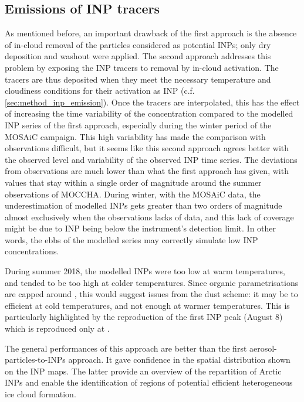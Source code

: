     \subsection{Emissions of INP tracers} 
    \label{sec:emissions_of_inp_tracers}
    As mentioned before, an important drawback of the first approach is the absence of in-cloud removal of the particles considered as potential INPs; only dry deposition and washout were applied.
    The second approach addresses this problem by exposing the INP tracers to removal by in-cloud activation. The tracers are thus deposited when they meet the necessary temperature and cloudiness conditions for their activation as INP (c.f. \cref{sec:method_inp_emission}). 
    Once the tracers are interpolated, this has the effect of increasing the time variability of the concentration compared to the modelled INP series of the first approach, especially during the winter period of the MOSAiC campaign.
    This high variability has made the comparison with observations difficult, but it seems like this second approach agrees better with the observed level and variability of the observed INP time series.
    The deviations from observations are much lower than what the first approach has given, with values that stay within a single order of magnitude around the summer observations of MOCCHA. During winter, with the MOSAiC data, the underestimation of modelled INPs gets greater than two orders of magnitude almost exclusively when the observations lacks of data, and this lack of coverage might be due to INP being below the instrument's detection limit. In other words, the ebbs of the modelled series may correctly simulate low INP concentrations.   
    
    During summer 2018, the modelled INPs were too low at warm temperatures, and tended to be too high at colder temperatures. Since organic parametrisations are capped around , this would suggest issues from the dust scheme: it may be to efficient at cold temperatures, and not enough at warmer temperatures.
    This is particularly highlighted by the reproduction of the first INP peak (August 8) which is reproduced only at .

    
    The general performances of this approach are better than the first aerosol-particles-to-INPs approach. It gave confidence in the spatial distribution shown on the INP maps. The latter provide an overview of the repartition of Arctic INPs and enable the identification of regions of potential efficient heterogeneous ice cloud formation. 




